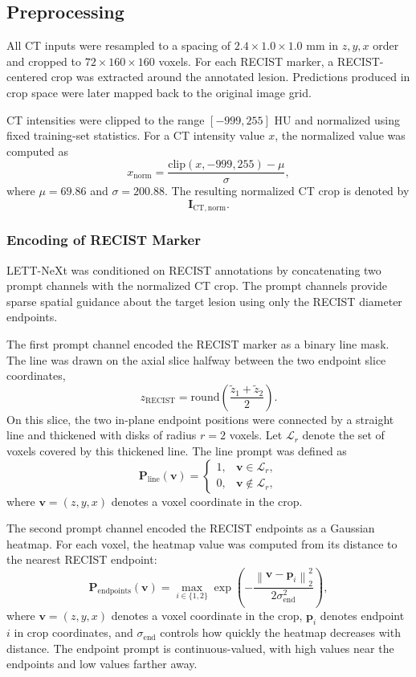 
\subsection{Preprocessing}
\label{sec:input_preprocessing}

All CT inputs were resampled to a spacing of \(2.4 \times 1.0 \times 1.0\) mm in \(z,y,x\) order and cropped to \(72 \times 160 \times 160\) voxels. 
For each RECIST marker, a RECIST-centered crop was extracted around the annotated lesion. 
Predictions produced in crop space were later mapped back to the original image grid.

CT intensities were clipped to the range \([-999, 255]\) HU and normalized using fixed training-set statistics. 
For a CT intensity value \(x\), the normalized value was computed as
\[
x_{\mathrm{norm}}
=
\frac{\mathrm{clip}(x, -999, 255) - \mu}{\sigma},
\]
where \(\mu = 69.86\) and \(\sigma = 200.88\). 
The resulting normalized CT crop is denoted by
\[
\mathbf{I}_{\mathrm{CT,norm}}.
\]


\subsubsection{Encoding of RECIST Marker}
\label{sec:recist_prompt_encoding}

LETT-NeXt was conditioned on RECIST annotations by concatenating two prompt channels with the normalized CT crop.
The prompt channels provide sparse spatial guidance about the target lesion using only the RECIST diameter endpoints. 

The first prompt channel encoded the RECIST marker as a binary line mask.
The line was drawn on the axial slice halfway between the two endpoint slice coordinates,
\[
z_{\mathrm{RECIST}}
=
\mathrm{round}
\left(
\frac{\tilde{z}_1+\tilde{z}_2}{2}
\right).
\]
On this slice, the two in-plane endpoint positions were connected by a straight line and thickened with disks of radius \(r=2\) voxels.
Let \(\mathcal{L}_r\) denote the set of voxels covered by this thickened line.
The line prompt was defined as
\[
\mathbf{P}_{\mathrm{line}}(\mathbf{v})
=
\left\{
\begin{array}{ll}
1, & \mathbf{v} \in \mathcal{L}_r, \\
0, & \mathbf{v} \notin \mathcal{L}_r,
\end{array}
\right.
\]
where \(\mathbf{v}=(z,y,x)\) denotes a voxel coordinate in the crop.

The second prompt channel encoded the RECIST endpoints as a Gaussian heatmap.
For each voxel, the heatmap value was computed from its distance to the nearest RECIST endpoint:
\[
\mathbf{P}_{\mathrm{endpoints}}(\mathbf{v})
=
\max_{i \in \{1,2\}}
\exp\left(
-\frac{
\left\| \mathbf{v} - \mathbf{p}_i \right\|_2^2
}{
2\sigma_{\mathrm{end}}^2
}
\right),
\]
where \(\mathbf{v}=(z,y,x)\) denotes a voxel coordinate in the crop, \(\mathbf{p}_i\) denotes endpoint \(i\) in crop coordinates, and \(\sigma_{\mathrm{end}}\) controls how quickly the heatmap decreases with distance.
The endpoint prompt is continuous-valued, with high values near the endpoints and low values farther away.

